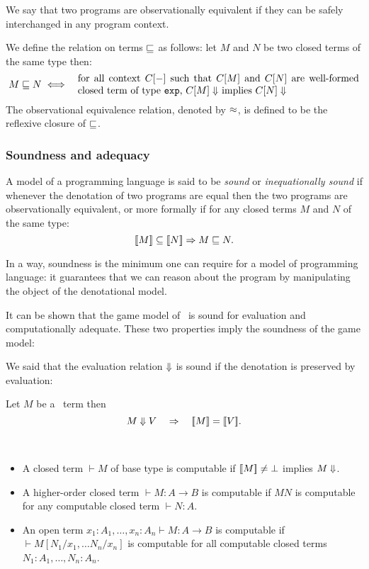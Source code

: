 We say that two programs are observationally equivalent if they
can be safely interchanged in any program context.
\begin{dfn}
We define the relation on terms $\sqsubseteq$ as follows: let $M$ and
$N$ be two closed terms of the same type then:
\begin{eqnarray*}
M \obspre N &\iff& \parbox{10cm}{for all context $C[-]$ such that
                $C[M]$ and $C[N]$ are well-formed closed term of type \texttt{exp},
                    $C[M] \eval$ implies $C[N] \eval$}
\end{eqnarray*}
The observational equivalence relation, denoted by $\approx$, is defined to be the reflexive closure of
$\sqsubseteq$.
\end{dfn}


\subsubsection{Soundness and adequacy}
A model of a programming language is said to be \emph{sound} or
\emph{inequationally sound} if whenever the denotation of two
programs are equal then the two programs are observationally
equivalent, or more formally if for any closed terms $M$ and $N$ of
the same type:
$$ {[\![ M ]\!]} \subseteq {[\![N ]\!]} \Rightarrow M \sqsubseteq N.$$

In a way, soundness is the minimum one can require for a model of
programming language: it guarantees that we can reason about the
program by manipulating the object of the denotational model.

It can be shown that the game model of \pcf\ is sound for evaluation
and computationally adequate. These two properties imply the
soundness of the game model:

We said that the evaluation relation $\Downarrow$ is sound if the
denotation is preserved by evaluation:
\begin{lem}
\label{lem:evalsoundness}
 Let $M$ be a \pcf\ term then
$$M \Downarrow V \quad \Rightarrow \quad {[\![M ]\!]} = {[\![ V ]\!]}.$$
\end{lem}

\begin{dfn} \
\begin{itemize}
\item A closed term $\vdash M$ of base type is computable if ${[\![ M ]\!]} \neq \bot$
implies $M \Downarrow$.
\item A higher-order closed term $\vdash M : A\rightarrow B$ is computable if $M N$ is computable for any computable closed term $\vdash  N:A$.
\item An open term $x_1 : A_1, \ldots, x_n : A_n \vdash M : A\rightarrow B$ is computable if $\vdash M [N_1/x_1, \ldots N_n/x_n]$ is computable
for all computable closed terms $N_1:A_1, \ldots, N_n:A_n$.
\end{itemize}
\end{dfn}

